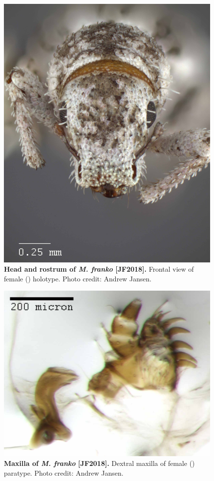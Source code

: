 \documentclass[fleqn,10pt,lineno]{wlpeerj} %
\begin{document}
\begin{figure}[h]
	\centering
	\includegraphics[width=\textwidth]{figure17.jpg}
	\caption{\textbf{Head and rostrum of \textit{M. franko} [JF2018].} Frontal view of female (\female) holotype. Photo credit: Andrew Jansen.}
	\label{fig:franko_F_frontal}
\end{figure}

\begin{figure}[h]
	\centering
	\includegraphics[width=\textwidth]{figure18.jpg}
	\caption{\textbf{Maxilla of \textit{M. franko} [JF2018].} Dextral maxilla of female (\female) paratype. Photo credit: Andrew Jansen.}
	\label{fig:franko_maxilla}
\end{figure}
\end{document}

